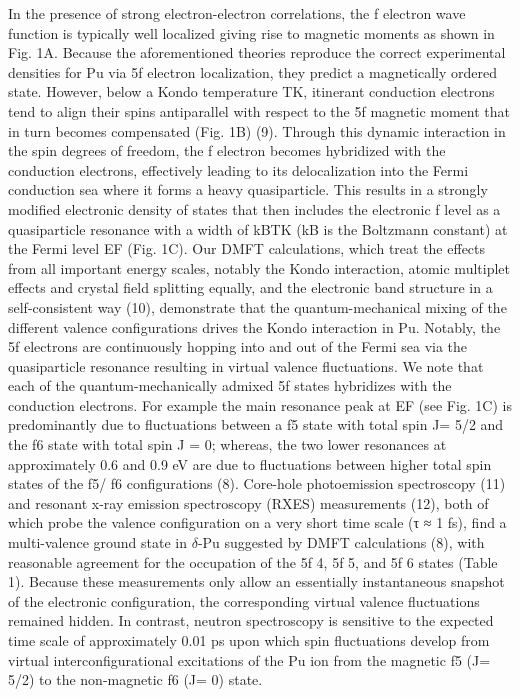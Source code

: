 \documentclass[10pt]{ruthesis}
\begin{document}
{In the presence of strong electron-electron correlations, the f electron wave function is typically well localized giving rise to magnetic moments as shown in Fig. 1A. Because the aforementioned theories reproduce the correct experimental densities for Pu via 5f electron localization, they predict a magnetically ordered state. However, below a Kondo temperature TK, itinerant conduction electrons tend to align their spins antiparallel with respect to the 5f magnetic moment that in turn becomes compensated (Fig. 1B) (9). Through this dynamic interaction in the spin degrees of freedom, the f electron becomes hybridized with the conduction electrons, effectively leading to its delocalization into the Fermi conduction sea where it forms a heavy quasiparticle. This results in a strongly modified electronic density of states that then includes the electronic f level as a quasiparticle resonance with a width of kBTK (kB is the Boltzmann constant) at the Fermi level EF (Fig. 1C).
Our DMFT calculations, which treat the effects from all important energy scales, notably the Kondo interaction, atomic multiplet effects and crystal field splitting equally, and the electronic band structure in a self-consistent way (10), demonstrate that the quantum-mechanical mixing of the different valence configurations drives the Kondo interaction in Pu. Notably, the 5f electrons are continuously hopping into and out of the Fermi sea via the quasiparticle resonance resulting in virtual valence fluctuations. We note that each of the quantum-mechanically admixed 5f states hybridizes with the conduction electrons. For example the main resonance peak at EF (see Fig. 1C) is predominantly due to fluctuations between a f5 state with total spin J= 5/2 and the f6 state with total spin J = 0; whereas, the two lower resonances at approximately 0.6 and 0.9 eV are due to fluctuations between higher total spin states of the f5/ f6 configurations (8).
Core-hole photoemission spectroscopy (11) and resonant x-ray emission spectroscopy (RXES) measurements (12), both of which probe the valence configuration on a very short time scale (τ ≈ 1 fs), find a multi-valence ground state in $\delta$-Pu suggested by DMFT calculations (8), with reasonable agreement for the occupation of the 5f 4, 5f 5, and 5f 6 states (Table 1). Because these measurements only allow an essentially instantaneous snapshot of the electronic configuration, the corresponding virtual valence fluctuations remained hidden. In contrast, neutron spectroscopy is sensitive to the expected time scale of approximately 0.01 ps upon which spin fluctuations develop from virtual interconfigurational excitations of the Pu ion from the magnetic f5 (J= 5/2) to the non-magnetic f6 (J= 0) state.
}
\end{document}
